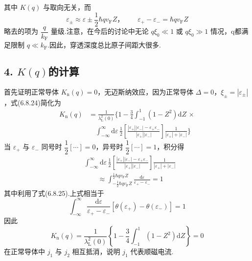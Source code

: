 其中 $K(q)$ 与取向无关，而
\begin{equation}
  \varepsilon_{\pm}\approx\varepsilon\pm\frac{1}{2}\hbar qv_{\mathrm{F}}Z\text{，}
  \qquad \varepsilon_{+}-\varepsilon_{-}=\hbar qv_{\mathrm{F}}Z
\end{equation}
略去的项为 $\dfrac{q}{k_{\mathrm{F}}}$ 量级.注意，在今后的讨论中无论 $q\xi_{0}\ll1$ 或 $q\xi_{0}\gg1$ 情况，q都满足限制 $q\ll k_{\mathrm{F}}$.因此，穿透深度总比原子间距大很多.

\subsection*{4. $K(q)$的计算}

首先证明正常导体 $K_{\mathrm{n}}(q)=0$，无迈斯纳效应，因为正常导体 $\Delta=0$，$\xi_{\pm}=|\varepsilon_{\pm}|$，式(6.8.24)简化为
\begin{equation}
\begin{aligned}
  K_{\mathrm{n}}(q)
  &=\frac{1}{\lambda_{\mathrm{L}}^{2}(0)}\biggl\{1-\frac{3}{4}
  \int_{-1}^{1}\left(1-Z^{2}\right)\mathrm{d}Z\,\times\\
  &\quad\int_{-\infty}^{\infty}\mathrm{d}\varepsilon\,
  \frac{1}{2}\left[\frac{|\varepsilon_{+}||\varepsilon_{-}|
  -\varepsilon_{+}\varepsilon_{-}}{|\varepsilon_{+}||\varepsilon_{-}|}\right]
  \frac{1}{|\varepsilon_{+}|+|\varepsilon_{-}|}\biggr\}
\end{aligned}
\end{equation}
当 $\varepsilon_{+}$ 与 $\varepsilon_{-}$ 同号时 $\dfrac{1}{2}\left[\cdots\right]=0$，异号时 $\dfrac{1}{2}\left[\cdots\right]=1$，积分得
\begin{equation}
\begin{aligned}
  &\int_{-\infty}^{\infty}\mathrm{d}\varepsilon\,
  \frac{1}{2}\left[\frac{|\varepsilon_{+}||\varepsilon_{-}|
  -\varepsilon_{+}\varepsilon_{-}}{|\varepsilon_{+}||\varepsilon_{-}|}\right]
  \frac{1}{|\varepsilon_{+}|+|\varepsilon_{-}|}\\
  &\qquad\approx\int_{-\frac{1}{2}\hbar qv_{\mathrm{F}}Z}
  ^{\frac{1}{2}\hbar qv_{\mathrm{F}}Z}
  \frac{\mathrm{d}\varepsilon}{\varepsilon_{+}-\varepsilon_{-}}=1
\end{aligned}
\end{equation}
其中利用了式(6.8.25).上式相当于
\begin{equation*}
  \int_{-\infty}^{\infty}\frac{\mathrm{d}\varepsilon}{\varepsilon_{+}-\varepsilon_{-}}
  \left[\theta(\varepsilon_{+})-\theta(\varepsilon_{-})\right]=1
\end{equation*}
因此
\begin{equation}
  K_{\mathrm{n}}(q)=\frac{1}{\lambda_{\mathrm{L}}^{2}(0)}
  \left\{1-\frac{3}{4}\int_{-1}^{1}\left(1-Z^{2}\right)\mathrm{d}Z\right\}=0
\end{equation}
在正常导体中 $j_{1}$ 与 $j_{2}$ 相互抵消，说明 $j_{1}$ 代表顺磁电流.

